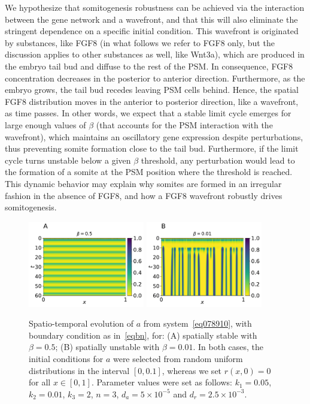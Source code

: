 \documentclass[11pt]{article}
\begin{document}
	We hypothesize that somitogenesis robustness can be achieved via the interaction
	between the gene network and a wavefront, and that this will also eliminate 
	the stringent dependence on a specific initial condition. This wavefront is originated by 
	substances, like FGF8 (in what follows we refer to FGF8 only, but the
	discussion applies to other substances as well, like Wnt3a), which are produced in the
	embryo tail bud and diffuse to the rest of the PSM. In consequence, FGF8
	concentration decreases in the posterior to anterior direction. Furthermore, 
	as the embryo grows, the tail bud recedes leaving PSM cells behind. Hence,
	the spatial FGF8 distribution moves in the anterior to posterior direction, like
	a wavefront, as time passes. In other words, we expect that a stable limit cycle 
	emerges for large
	enough values of $\beta$ (that accounts for the PSM interaction with the
	wavefront), which maintains an oscillatory gene expression despite perturbations, 
	thus preventing somite formation close to the tail bud. Furthermore, if the limit
	cycle turns unstable below a given $\beta$ threshold, any perturbation would
	lead to the formation of a somite at the PSM position where the threshold is
	reached. This dynamic behavior may explain why somites are formed in an
	irregular fashion in the absence of FGF8, and how a FGF8 wavefront robustly
	drives somitogenesis.
	
	\begin{figure}[t!]
		\centering
		\includegraphics[width=2in]{Figures/Fig03aRev.pdf}
		\includegraphics[width=2in]{Figures/Fig03bRev.pdf}
		\caption{Spatio-temporal evolution of $a$ from system~\eqref{eq078910}, with
			boundary condition as in~\eqref{eqbn}, for: (A) spatially stable with
			$\beta=0.5$; (B) spatially unstable with $\beta=0.01$. In both cases, the
			initial conditions for $a$ were selected from random uniform distributions in
			the interval $[0, 0.1]$, whereas we set $r(x, 0) = 0$ for all $x\in[0,1]$.
			Parameter values were set as follows: $k_1=0.05$, $k_2=0.01$, $k_3=2$, $n=3$, $d_a =
			5\times10^{-5}$ and $d_r=2.5\times10^{-3}$.}
		\label{Fig03}
	\end{figure}
	
\end{document}
